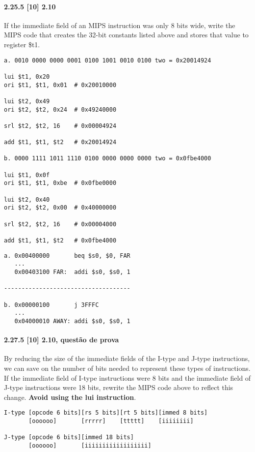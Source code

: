 \documentclass{article}
\begin{document}
\paragraph{2.25.5  [10] 2.10} If the immediate field of an MIPS instruction was
only 8 bits wide, write the MIPS code that creates the 32-bit constants listed
above and stores that value to register \$t1.

\begin{verbatim}
a. 0010 0000 0000 0001 0100 1001 0010 0100 two = 0x20014924

lui $t1, 0x20
ori $t1, $t1, 0x01  # 0x20010000

lui $t2, 0x49
ori $t2, $t2, 0x24  # 0x49240000

srl $t2, $t2, 16    # 0x00004924

add $t1, $t1, $t2   # 0x20014924

b. 0000 1111 1011 1110 0100 0000 0000 0000 two = 0x0fbe4000

lui $t1, 0x0f
ori $t1, $t1, 0xbe  # 0x0fbe0000

lui $t2, 0x40
ori $t2, $t2, 0x00  # 0x40000000

srl $t2, $t2, 16    # 0x00004000

add $t1, $t1, $t2   # 0x0fbe4000
\end{verbatim}


\pagebreak

\begin{verbatim}
a. 0x00400000       beq $s0, $0, FAR
   ...
   0x00403100 FAR:  addi $s0, $s0, 1

------------------------------------

b. 0x00000100       j 3FFFC
   ...
   0x04000010 AWAY: addi $s0, $s0, 1
\end{verbatim}

\paragraph{2.27.5 [10] 2.10, questão de prova} By reducing the size of the
immediate fields of the I-type and J-type instructions, we can save on the
number of bits needed to represent these types of instructions. If the immediate
field of I-type instructions were 8 bits and the immediate field of J-type
instructions were 18 bits, rewrite the MIPS code above to reflect this change.
\textbf{Avoid using the lui instruction}.

\begin{verbatim}
I-type [opcode 6 bits][rs 5 bits][rt 5 bits][immed 8 bits]
       [oooooo]       [rrrrr]    [ttttt]    [iiiiiiii]

J-type [opcode 6 bits][immed 18 bits]
       [oooooo]       [iiiiiiiiiiiiiiiiii]
\end{verbatim}
\end{document}

